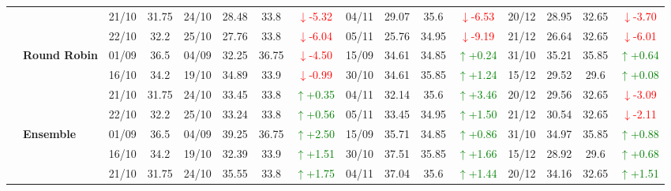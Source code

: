 {\begin{longtable}{llcc|cccc|cccc|cccc}
&
& 21/10 & 31.75 & 24/10 & 28.48 & 33.8 & \textcolor{red}{\(\downarrow\)-5.32} & 04/11 & 29.07 & 35.6 & \textcolor{red}{\(\downarrow\)-6.53} & 20/12 & 28.95 & 32.65 & \textcolor{red}{\(\downarrow\)-3.70} \\

&
& 22/10 & 32.2 & 25/10 & 27.76 & 33.8 & \textcolor{red}{\(\downarrow\)-6.04} & 05/11 & 25.76 & 34.95 & \textcolor{red}{\(\downarrow\)-9.19} & 21/12 & 26.64 & 32.65 & \textcolor{red}{\(\downarrow\)-6.01} \\
\cmidrule(lr){2-16}


& \textbf{Round Robin}
& 01/09 & 36.5 & 04/09 & 32.25 & 36.75 & \textcolor{red}{\(\downarrow\)-4.50} & 15/09 & 34.61 & 34.85 & \textcolor{green}{\(\uparrow\)+0.24} & 31/10 & 35.21 & 35.85 & \textcolor{green}{\(\uparrow\)+0.64} \\

&
& 16/10 & 34.2 & 19/10 & 34.89 & 33.9 & \textcolor{red}{\(\downarrow\)-0.99} & 30/10 & 34.61 & 35.85 & \textcolor{green}{\(\uparrow\)+1.24} & 15/12 & 29.52 & 29.6 & \textcolor{green}{\(\uparrow\)+0.08} \\

&
& 21/10 & 31.75 & 24/10 & 33.45 & 33.8 & \textcolor{green}{\(\uparrow\)+0.35} & 04/11 & 32.14 & 35.6 & \textcolor{green}{\(\uparrow\)+3.46} & 20/12 & 29.56 & 32.65 & \textcolor{red}{\(\downarrow\)-3.09} \\

&
& 22/10 & 32.2 & 25/10 & 33.24 & 33.8 & \textcolor{green}{\(\uparrow\)+0.56} & 05/11 & 33.45 & 34.95 & \textcolor{green}{\(\uparrow\)+1.50} & 21/12 & 30.54 & 32.65 & \textcolor{red}{\(\downarrow\)-2.11} \\
\cmidrule(lr){2-16}



& \textbf{Ensemble}
& 01/09 & 36.5 & 04/09 & 39.25 & 36.75 & \textcolor{green}{\(\uparrow\)+2.50} & 15/09 & 35.71 & 34.85 & \textcolor{green}{\(\uparrow\)+0.86} & 31/10 & 34.97 & 35.85 & \textcolor{green}{\(\uparrow\)+0.88} \\

&
& 16/10 & 34.2 & 19/10 & 32.39 & 33.9 & \textcolor{green}{\(\uparrow\)+1.51} & 30/10 & 37.51 & 35.85 & \textcolor{green}{\(\uparrow\)+1.66} & 15/12 & 28.92 & 29.6 & \textcolor{green}{\(\uparrow\)+0.68} \\

&
& 21/10 & 31.75 & 24/10 & 35.55 & 33.8 & \textcolor{green}{\(\uparrow\)+1.75} & 04/11 & 37.04 & 35.6 & \textcolor{green}{\(\uparrow\)+1.44} & 20/12 & 34.16 & 32.65 & \textcolor{green}{\(\uparrow\)+1.51} \\


\end{longtable}}
